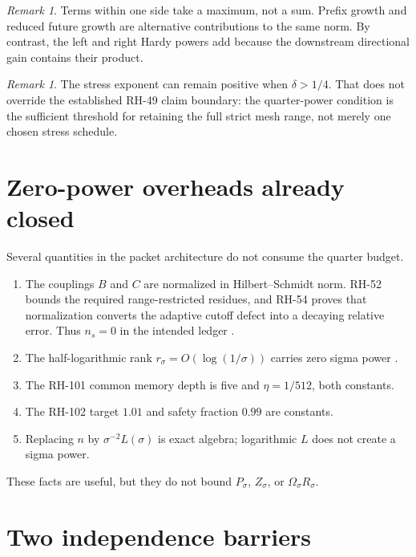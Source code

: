 \documentclass[11pt]{article}
\theoremstyle{definition}
\theoremstyle{remark}
\newtheorem{remark}[theorem]{Remark}
\begin{document}
\begin{remark}
Terms within one side take a maximum, not a sum.  Prefix growth and reduced
future growth are alternative contributions to the same norm.  By contrast,
the left and right Hardy powers add because the downstream directional gain
contains their product.
\end{remark}

\begin{remark}
The stress exponent can remain positive when $\delta>1/4$.  That does not
override the established RH-49 claim boundary: the quarter-power condition is
the sufficient threshold for retaining the full strict mesh range, not merely
one chosen stress schedule.
\end{remark}

\section{Zero-power overheads already closed}
\label{sec:zero}

Several quantities in the packet architecture do not consume the quarter
budget.
\begin{enumerate}[leftmargin=2em]
\item The couplings $B$ and $C$ are normalized in Hilbert--Schmidt norm.
RH-52 bounds the required range-restricted residues, and RH-54 proves that
normalization converts the adaptive cutoff defect into a decaying relative
error.  Thus $n_s=0$ in the intended ledger
\citep{WangFactorTransfer2026,WangFactorAware2026}.
\item The half-logarithmic rank $r_\sigma=O(\log(1/\sigma))$ carries zero
sigma power \citep{WangHalfLog2026}.
\item The RH-101 common memory depth is five and $\eta=1/512$, both constants.
\item The RH-102 target $1.01$ and safety fraction $0.99$ are constants.
\item Replacing $n$ by $\sigma^{-2}L(\sigma)$ is exact algebra; logarithmic
$L$ does not create a sigma power.
\end{enumerate}

These facts are useful, but they do not bound $P_\sigma$, $Z_\sigma$, or
$\Omega_\sigma R_\sigma$.

\section{Two independence barriers}
\label{sec:barriers}
\end{document}
